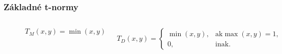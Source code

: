 \documentclass{beamer}
\begin{document}
\begin{frame}
\frametitle{Základné t-normy}
\begin{columns}
\begin{minipage}[c][0.4\textheight][c]{\linewidth}
  \centering
  \includegraphics[width=0.9\linewidth]{MinimumTnorm}
\end{minipage}
\begin{minipage}[c][0.4\textheight][c]{\linewidth}
  \centering
  \includegraphics[width=0.9\linewidth]{DrasticTnorm}
\end{minipage}
\begin{minipage}[c][0.4\textheight][c]{\linewidth}
$$ T_M(x,y)=\min(x,y)$$
\end{minipage}
\begin{minipage}[c][0.4\textheight][c]{\linewidth}
\footnotesize $$ T_D(x,y)=\begin{cases} \min(x,y),  &\mbox {ak
$\max(x,y)=1,$} \\0,  &\mbox
{inak.}\end{cases}$$
\end{minipage}
\end{columns}
\end{frame}
\end{document}
